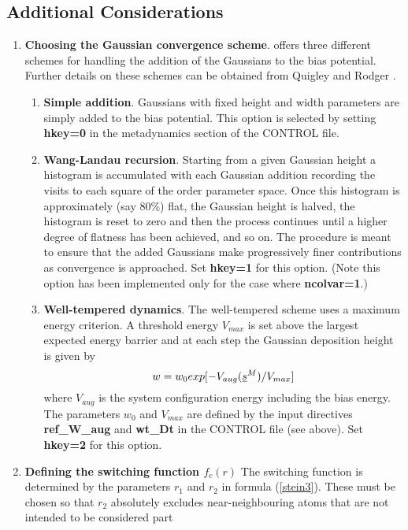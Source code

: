 \subsection{Additional Considerations}
\label{metadextras}
\begin{enumerate}
\item {\bf Choosing the Gaussian convergence scheme}. \D{} offers three
  different schemes for handling the addition of the Gaussians to the
  bias potential. Further details on these schemes can be obtained from
  Quigley and Rodger \cite{quigley-09a}.
\begin{enumerate}
\item {\bf Simple addition}. Gaussians with fixed height and width parameters 
  are simply added to the bias
  potential. This option is selected by setting {\bf hkey=0} in the
  metadynamics section of the CONTROL file.
\item {\bf Wang-Landau recursion}. Starting from a given Gaussian height a
  histogram is accumulated with each Gaussian addition recording the visits to
  each square of the order parameter space. Once this histogram is
  approximately (say 80\%) flat, the Gaussian height is halved, the histogram
  is reset to zero and then the process continues until a higher degree of
  flatness has been achieved, and so on. The procedure is meant to 
  ensure that the added Gaussians make progressively finer contributions as
  convergence is approached. Set {\bf hkey=1} for this option. (Note this
  option has been implemented only for the case where {\bf ncolvar=1}.)
\item {\bf Well-tempered dynamics}. The well-tempered scheme uses a maximum
  energy criterion. A threshold energy $V_{max}$ is set above the largest
  expected energy barrier and at each step the Gaussian deposition height is
  given by \[ w=w_{0}exp[-V_{aug}(\mbox{$\underline{s}$}^{M})/V_{max}] \] where $V_{aug}$ is the
  system configuration energy including the bias energy. The parameters
  $w_{0}$ and $V_{max}$ are defined by the input directives {\bf ref\_W\_aug}
  and {\bf wt\_Dt} in the CONTROL file (see above). Set {\bf hkey=2} for
  this option.
\end{enumerate}
\item {\bf Defining the switching function $f_{c}(r)$}\newline
  The switching function is determined by the parameters $r_{1}$ and $r_{2}$
  in formula (\ref{stein3}). These must be chosen so that $r_{2}$ absolutely
  excludes near-neighbouring atoms that are not intended to be considered part

\end{enumerate}
